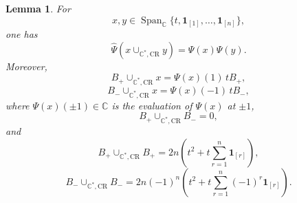 \documentclass[a4paper,reqno]{amsart}
\theoremstyle{plain} %
\newtheorem{lmm}[thm]{Lemma}
\theoremstyle{definition} %
\theoremstyle{remark} %
\newcommand{\C}{\mathbb{C}}
\newcommand{\1}{\mathds{1}}   %
\begin{document}
\begin{lmm}\label{lem:D-CR-compact}
For
\[
x,y\in
\operatorname{Span}_{\mathbb C}
\{t,\mathbf1_{[1]},\ldots,\mathbf1_{[n]}\},
\]
one has
\begin{equation}\label{eq:D-cyclic-product}
\widehat\Psi
\left(
x\cup_{\mathbb C^*,\mathrm{CR}}y
\right)
=
\Psi(x)\Psi(y).
\end{equation}
Moreover,
\begin{equation}\label{eq:D-B-action}
B_+\cup_{\mathbb C^*,\mathrm{CR}}x
=
\Psi(x)(1)\,tB_+,
\end{equation}
\begin{equation}\label{eq:D-X-action}
B_-\cup_{\mathbb C^*,\mathrm{CR}}x
=
\Psi(x)(-1)\,tB_-,
\end{equation}
where $\Psi(x)(\pm1) \in \C$ is the evaluation of $\Psi(x)$ at $\pm 1$,
\begin{equation}\label{eq:D-BX}
B_+\cup_{\mathbb C^*,\mathrm{CR}}B_-=0,
\end{equation}
and
\begin{equation}\label{eq:D-B-square}
B_+\cup_{\mathbb C^*,\mathrm{CR}}B_+
=
2n
\left(
t^2+
t\sum_{r=1}^n\mathbf1_{[r]}
\right),
\end{equation}
\begin{equation}\label{eq:D-X-square}
B_-\cup_{\mathbb C^*,\mathrm{CR}}B_-
=
2n(-1)^n
\left(
t^2+
t\sum_{r=1}^n(-1)^r\mathbf1_{[r]}
\right).
\end{equation}
\end{lmm}
\end{document}
